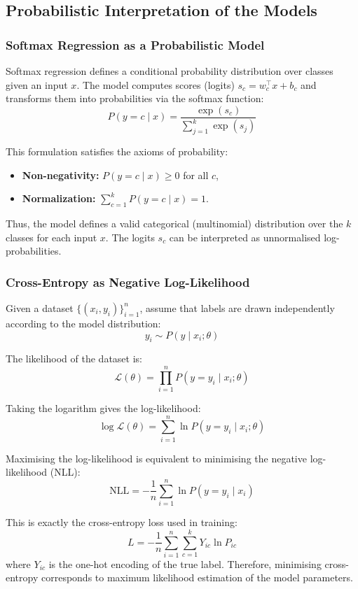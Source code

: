 \documentclass[11pt]{article}
\begin{document}
\subsection{Probabilistic Interpretation of the Models}

\subsubsection{Softmax Regression as a Probabilistic Model}

Softmax regression defines a conditional probability distribution over classes given an input $x$. The model computes scores (logits) $s_c = w_c^\top x + b_c$ and transforms them into probabilities via the softmax function:
\[
    P(y = c \mid x) = \frac{\exp(s_c)}{\sum_{j=1}^{k} \exp(s_j)}
\]

This formulation satisfies the axioms of probability:
\begin{itemize}[leftmargin=2em]
    \item \textbf{Non-negativity:} $P(y=c \mid x) \geq 0$ for all $c$,
    \item \textbf{Normalization:} $\sum_{c=1}^{k} P(y=c \mid x) = 1$.
\end{itemize}

Thus, the model defines a valid categorical (multinomial) distribution over the $k$ classes for each input $x$. The logits $s_c$ can be interpreted as unnormalised log-probabilities.

\subsubsection{Cross-Entropy as Negative Log-Likelihood}

Given a dataset $\{(x_i, y_i)\}_{i=1}^{n}$, assume that labels are drawn independently according to the model distribution:
\[
    y_i \sim P(y \mid x_i; \theta)
\]

The likelihood of the dataset is:
\[
    \mathcal{L}(\theta) = \prod_{i=1}^{n} P(y = y_i \mid x_i; \theta)
\]

Taking the logarithm gives the log-likelihood:
\[
    \log \mathcal{L}(\theta) = \sum_{i=1}^{n} \ln P(y = y_i \mid x_i; \theta)
\]

Maximising the log-likelihood is equivalent to minimising the negative log-likelihood (NLL):
\[
    \text{NLL} = -\frac{1}{n} \sum_{i=1}^{n} \ln P(y = y_i \mid x_i)
\]

This is exactly the cross-entropy loss used in training:
\[
    L = -\frac{1}{n} \sum_{i=1}^{n} \sum_{c=1}^{k} Y_{ic} \ln P_{ic}
\]
where $Y_{ic}$ is the one-hot encoding of the true label. Therefore, minimising cross-entropy corresponds to maximum likelihood estimation of the model parameters.
\end{document}
